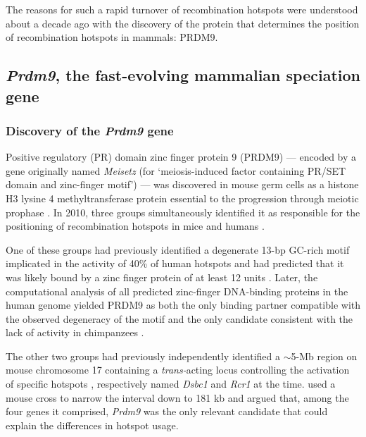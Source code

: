 The reasons for such a rapid turnover of recombination hotspots were understood about a decade ago with the discovery of the protein that determines the position of recombination hotspots in mammals: PRDM9.


\subsection{\textit{Prdm9}, the fast-evolving mammalian speciation gene}

\subsubsection{Discovery of the \textit{Prdm9} gene}
Positive regulatory (PR) domain zinc finger protein 9 (PRDM9) — encoded by a gene originally named \textit{Meisetz} (for ‘meiosis-induced factor containing PR/SET domain and zinc-finger motif’) — was discovered in mouse germ cells as a histone H3 lysine 4 methyltransferase protein essential to the progression through meiotic prophase \citep{hayashi2005histone,hayashi2006meisetz}.
In 2010, three groups simultaneously identified it as responsible for the positioning of recombination hotspots in mice and humans \citep[reviewed in \citealp{cheung2010genetic} and \citealp{hochwagen2010meiosis}]{baudat2010prdm9,myers2010drive,parvanov2010prdm9}.

One of these groups had previously identified a degenerate 13-bp GC-rich motif \citep{myers2005finescale} implicated in the activity of 40\% of human hotspots \citep{myers2008common,webb2008sperm} and had predicted that it was likely bound by a zinc finger protein of at least 12 units \citep{myers2008common}.
Later, the computational analysis of all predicted zinc-finger DNA-binding proteins in the human genome yielded PRDM9 as both the only binding partner compatible with the observed degeneracy of the motif and the only candidate consistent with the lack of activity in chimpanzees \citep{myers2010drive}.

The other two groups had previously independently identified a $\sim$5-Mb region on mouse chromosome 17 containing a \textit{trans-}acting locus controlling the activation of specific hotspots \citep{grey2009genomewide,parvanov2009transregulation}, respectively named \textit{Dsbc1} and \textit{Rcr1} at the time.
\citet{parvanov2010prdm9} used a mouse cross to narrow the interval down to 181 kb and argued that, among the four genes it comprised, \textit{Prdm9} was the only relevant candidate that could explain the differences in hotspot usage.

